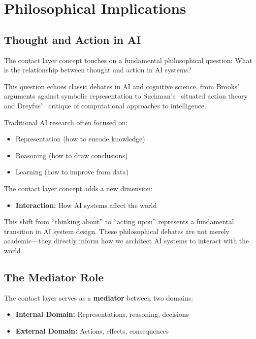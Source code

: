 \section{Philosophical Implications}

\subsection{Thought and Action in AI}

The contact layer concept touches on a fundamental philosophical question: What is the relationship between thought and action in AI systems?

This question echoes classic debates in AI and cognitive science, from Brooks'~\cite{brooks1991} arguments against symbolic representation to Suchman's~\cite{suchman1987} situated action theory and Dreyfus'~\cite{dreyfus1972} critique of computational approaches to intelligence.

Traditional AI research often focused on:
\begin{itemize}[leftmargin=*]
\item Representation (how to encode knowledge)
\item Reasoning (how to draw conclusions)
\item Learning (how to improve from data)
\end{itemize}

The contact layer concept adds a new dimension:
\begin{itemize}[leftmargin=*]
\item \textbf{Interaction:} How AI systems affect the world
\end{itemize}

This shift from ``thinking about'' to ``acting upon'' represents a fundamental transition in AI system design. These philosophical debates are not merely academic---they directly inform how we architect AI systems to interact with the world.

\subsection{The Mediator Role}

The contact layer serves as a \textbf{mediator} between two domains:
\begin{itemize}[leftmargin=*]
\item \textbf{Internal Domain:} Representations, reasoning, decisions
\item \textbf{External Domain:} Actions, effects, consequences
\end{itemize}

